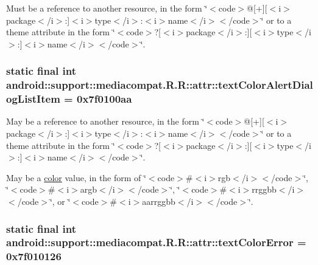 Must be a reference to another resource, in the form \char`\"{}$<$code$>$@\mbox{[}+\mbox{]}\mbox{[}$<$i$>$package$<$/i$>$:\mbox{]}$<$i$>$type$<$/i$>$:$<$i$>$name$<$/i$>$$<$/code$>$\char`\"{} or to a theme attribute in the form \char`\"{}$<$code$>$?\mbox{[}$<$i$>$package$<$/i$>$:\mbox{]}\mbox{[}$<$i$>$type$<$/i$>$:\mbox{]}$<$i$>$name$<$/i$>$$<$/code$>$\char`\"{}. \hypertarget{classandroid_1_1support_1_1mediacompat_1_1_r_1_1attr_523948dd941f16d7654e293ff40f2cf8}{
\subsubsection[{textColorAlertDialogListItem}]{\setlength{\rightskip}{0pt plus 5cm}static final int android::support::mediacompat.R.R::attr::textColorAlertDialogListItem = 0x7f0100aa}}
\label{classandroid_1_1support_1_1mediacompat_1_1_r_1_1attr_523948dd941f16d7654e293ff40f2cf8}


May be a reference to another resource, in the form \char`\"{}$<$code$>$@\mbox{[}+\mbox{]}\mbox{[}$<$i$>$package$<$/i$>$:\mbox{]}$<$i$>$type$<$/i$>$:$<$i$>$name$<$/i$>$$<$/code$>$\char`\"{} or to a theme attribute in the form \char`\"{}$<$code$>$?\mbox{[}$<$i$>$package$<$/i$>$:\mbox{]}\mbox{[}$<$i$>$type$<$/i$>$:\mbox{]}$<$i$>$name$<$/i$>$$<$/code$>$\char`\"{}. 

May be a \hyperlink{classandroid_1_1support_1_1mediacompat_1_1_r_1_1color}{color} value, in the form of \char`\"{}$<$code$>$\#$<$i$>$rgb$<$/i$>$$<$/code$>$\char`\"{}, \char`\"{}$<$code$>$\#$<$i$>$argb$<$/i$>$$<$/code$>$\char`\"{}, \char`\"{}$<$code$>$\#$<$i$>$rrggbb$<$/i$>$$<$/code$>$\char`\"{}, or \char`\"{}$<$code$>$\#$<$i$>$aarrggbb$<$/i$>$$<$/code$>$\char`\"{}. \hypertarget{classandroid_1_1support_1_1mediacompat_1_1_r_1_1attr_571bce201d1262cfd2afcc4032f5171b}{
\subsubsection[{textColorError}]{\setlength{\rightskip}{0pt plus 5cm}static final int android::support::mediacompat.R.R::attr::textColorError = 0x7f010126}}
\label{classandroid_1_1support_1_1mediacompat_1_1_r_1_1attr_571bce201d1262cfd2afcc4032f5171b}


